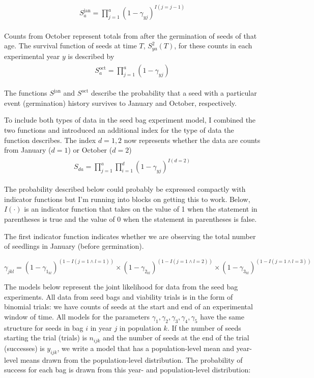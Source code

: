 \documentclass[12pt, oneside, titlepage]{article}   	%
\begin{document}
\begin{align}
  \begin{split}
S^\mathrm{jan}_{a} = \prod_{j=1}^{a} (1- \gamma_{yj} )^{I(j=j-1)}
  \end{split}
\end{align}

Counts from October represent totals from after  the germination of seeds of that age. The survival function of seeds at time $T$, $S^2_{ya}(T)$, for these counts in each experimental year $y$ is described by
%
\begin{align}
  \begin{split}
S^\mathrm{oct}_{a} = \prod_{j=1}^{a} (1- \gamma_{yj} )
  \end{split}
\end{align}
%

The functions $S^\mathrm{jan}$ and $S^\mathrm{oct}$ describe the probability that a seed with a particular event (germination) history survives to January and October, respectively. 

To include both types of data in the seed bag experiment model, I combined the two functions and introduced an additional index for the type of data the function describes. The index $d=1,2$ now represents whether the data are counts from January ($d=1$) or October ($d=2$)
%
\begin{align}
  \begin{split}
S_{da} =  \prod_{j=1}^{a} \prod_{i=1}^{d}  (1- \gamma_{yj} )^{I(d=2)}
  \end{split}
\end{align}
%

%


The probability described below could probably be expressed compactly with indicator functions but I'm running into blocks on getting this to work. Below, $I(\cdot)$ is an indicator function that takes on the value of 1 when the statement in parentheses is true and the value of 0 when the statement in parentheses is false.

The first indicator function indicates whether we are observing the total number of seedlings in January (before germination).


\clearpage
$ \gamma_{jkl} = (1-\gamma_{1_{kl}})^{(1-I(j=1 \land l=1))} \times (1-\gamma_{2_{kl}})^{(1-I(j=1 \land l=2))} \times (1-\gamma_{3_{kl}})^{(1-I(j=1 \land l=3))}$


\clearpage

The models below represent the joint likelihood for data from the seed bag experiments. All data from seed bags and viability trials is in the form of binomial trials: we have counts of seeds at the start and end of an experimental window of time. All models for the parameters $\gamma_1, \gamma_2, \gamma_3, \gamma_4, \gamma_5$ have the same structure for seeds in bag $i$ in year $j$ in population $k$. If the number of seeds starting the trial (trials) is $n_{ijk}$ and the number of seeds at the end of the trial (successes) is $y_{ijk}$, we write a model that has a population-level mean and year-level means drawn from the population-level distribution. The probability of success for each bag is drawn from this year- and population-level distribution:
\end{document}
